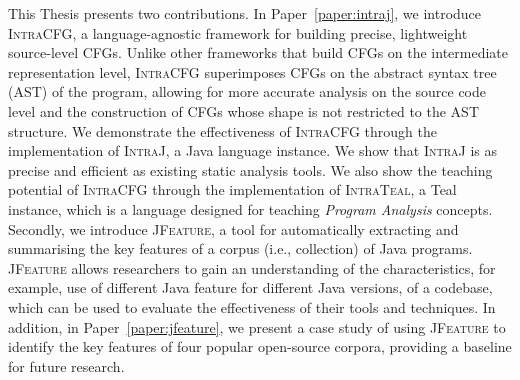 This Thesis presents two contributions.
In Paper~\ref{paper:intraj},  we introduce \textsc{IntraCFG}, a language-agnostic framework for building
precise, lightweight source-level CFGs. Unlike other frameworks that
build CFGs on the intermediate representation level, \textsc{IntraCFG} superimposes
CFGs on the abstract syntax tree (AST) of the program, allowing for more accurate
analysis on the source code level and the construction of CFGs whose shape is not
restricted to the AST structure. We demonstrate the effectiveness
of \textsc{IntraCFG} through the implementation of \textsc{IntraJ}, a Java language
instance. We show that \textsc{IntraJ} is as precise and efficient as existing
static analysis tools. We also show the teaching potential of \textsc{IntraCFG}
through the implementation of \textsc{IntraTeal}, a Teal instance, which
is a language designed for teaching \emph{Program Analysis} concepts.
Secondly, we introduce \textsc{JFeature}, a tool for automatically extracting and summarising
the key features of a corpus (i.e., collection) of Java programs. \textsc{JFeature}
allows researchers to gain an understanding of the characteristics, for example,
use of different Java feature for different Java versions, of a codebase,
which can be used to evaluate the effectiveness of their tools and techniques.
In addition, in Paper~\ref{paper:jfeature}, we present a case study of using \textsc{JFeature} to
identify the key features of four popular open-source corpora, providing a
baseline for future research.
